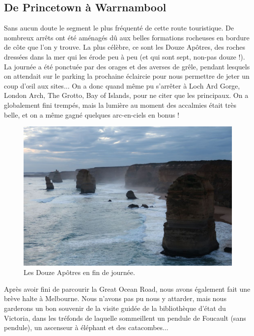 \hypertarget{de-princetown-uxe0-warrnambool}{%
\subsection{De Princetown à
Warrnambool}\label{de-princetown-uxe0-warrnambool}}

Sans aucun doute le segment le plus fréquenté de cette route
touristique. De nombreux arrêts ont été aménagés dû aux belles
formations rocheuses en bordure de côte que l'on y trouve. La plus
célèbre, ce sont les Douze Apôtres, des roches dressées dans la mer qui
les érode peu à peu (et qui sont sept, non-pas douze !). La journée a
été ponctuée par des orages et des averses de grêle, pendant lesquels on
attendait sur le parking la prochaine éclaircie pour nous permettre de
jeter un coup d'œil aux sites... On a donc quand même pu s'arrêter à
Loch Ard Gorge, London Arch, The Grotto, Bay of Islands, pour ne citer
que les principaux. On a globalement fini trempés, mais la lumière au
moment des accalmies était très belle, et on a même gagné quelques
arc-en-ciels en bonus !

\begin{figure}
\centering
\includegraphics{images/20180731_douzeapotres.JPG}
\caption{Les Douze Apôtres en fin de journée.}
\end{figure}

Après avoir fini de parcourir la Great Ocean Road, nous avons également
fait une brève halte à Melbourne. Nous n'avons pas pu nous y attarder,
mais nous garderons un bon souvenir de la visite guidée de la
bibliothèque d'état du Victoria, dans les tréfonds de laquelle
sommeillent un pendule de Foucault (sans pendule), un ascenseur à
éléphant et des catacombes...

